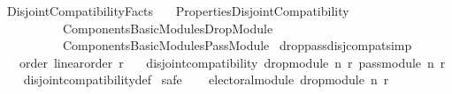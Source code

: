 %
\begin{isabellebody}%
%
%
\isadelimtheory
%
\endisadelimtheory
%
\isatagtheory
{}\isamarkupfalse%
\ Disjoint{\isacharunderscore}{\kern0pt}Compatibility{\isacharunderscore}{\kern0pt}Facts\isanewline
\ \ \ {\isachardoublequoteopen}{\isachardot}{\kern0pt}{\isachardot}{\kern0pt}{\isacharslash}{\kern0pt}Properties{\isacharslash}{\kern0pt}Disjoint{\isacharunderscore}{\kern0pt}Compatibility{\isachardoublequoteclose}\isanewline
\ \ \ \ \ \ \ \ \ \ {\isachardoublequoteopen}{\isachardot}{\kern0pt}{\isachardot}{\kern0pt}{\isacharslash}{\kern0pt}Components{\isacharslash}{\kern0pt}Basic{\isacharunderscore}{\kern0pt}Modules{\isacharslash}{\kern0pt}Drop{\isacharunderscore}{\kern0pt}Module{\isachardoublequoteclose}\isanewline
\ \ \ \ \ \ \ \ \ \ {\isachardoublequoteopen}{\isachardot}{\kern0pt}{\isachardot}{\kern0pt}{\isacharslash}{\kern0pt}Components{\isacharslash}{\kern0pt}Basic{\isacharunderscore}{\kern0pt}Modules{\isacharslash}{\kern0pt}Pass{\isacharunderscore}{\kern0pt}Module{\isachardoublequoteclose}\isanewline
\isanewline
{}%
\endisatagtheory
{\isafoldtheory}%
%
\isadelimtheory
\isanewline
%
\endisadelimtheory
\isanewline
\isanewline
{}\isamarkupfalse%
\ drop{\isacharunderscore}{\kern0pt}pass{\isacharunderscore}{\kern0pt}disj{\isacharunderscore}{\kern0pt}compat{\isacharbrackleft}{\kern0pt}simp{\isacharbrackright}{\kern0pt}{\isacharcolon}{\kern0pt}\isanewline
\ \ \ order{\isacharcolon}{\kern0pt}\ {\isachardoublequoteopen}linear{\isacharunderscore}{\kern0pt}order\ r{\isachardoublequoteclose}\isanewline
\ \ \ {\isachardoublequoteopen}disjoint{\isacharunderscore}{\kern0pt}compatibility\ {\isacharparenleft}{\kern0pt}drop{\isacharunderscore}{\kern0pt}module\ n\ r{\isacharparenright}{\kern0pt}\ {\isacharparenleft}{\kern0pt}pass{\isacharunderscore}{\kern0pt}module\ n\ r{\isacharparenright}{\kern0pt}{\isachardoublequoteclose}\isanewline
%
\isadelimproof
\ \ %
\endisadelimproof
%
\isatagproof
{}\isamarkupfalse%
\ disjoint{\isacharunderscore}{\kern0pt}compatibility{\isacharunderscore}{\kern0pt}def\isanewline
{}\isamarkupfalse%
\ {\isacharparenleft}{\kern0pt}safe{\isacharparenright}{\kern0pt}\isanewline
\ \ \isamarkupfalse%
\ {\isachardoublequoteopen}electoral{\isacharunderscore}{\kern0pt}module\ {\isacharparenleft}{\kern0pt}drop{\isacharunderscore}{\kern0pt}module\ n\ r{\isacharparenright}{\kern0pt}{\isachardoublequoteclose}\isanewline

\end{isabellebody}
